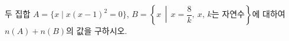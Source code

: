 두 집합 $A=\{x \mid x(x-1)^2=0\}$, $B=\left\{x \,\middle|\, x=\dfrac{8}{k},\ x,\,k\text{는 자연수}\right\}$에 대하여 $n(A)+n(B)$의 값을 구하시오.
